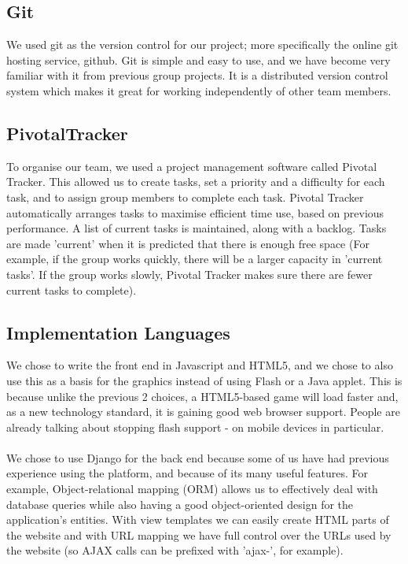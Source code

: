 \documentclass{article}
\begin{document}
\subsection{Git}
We used git as the version control for our project; more specifically the online git hosting service, github. Git is simple and easy to use, and we have become very familiar with it from previous group projects. It is a distributed version control system which makes it great for working independently of other team members.

\subsection{PivotalTracker}
To organise our team, we used a project management software called Pivotal Tracker. This allowed us to create tasks, set a priority and a difficulty for each task, and to assign group members to complete each task. Pivotal Tracker automatically arranges tasks to maximise efficient time use, based on previous performance. A list of current tasks is maintained, along with a backlog. Tasks are made 'current' when it is predicted that there is enough free space (For example, if the group works quickly, there will be a larger capacity in 'current tasks'. If the group works slowly, Pivotal Tracker makes sure there are fewer current tasks to complete).

\subsection{Implementation Languages}
We chose to write the front end in Javascript and HTML5, and we chose to also use this as a basis for the graphics instead of using Flash or a Java applet. This is because unlike the previous 2 choices, a HTML5-based game will load faster and, as a new technology standard, it is gaining good web browser support. People are already talking about stopping flash support - on mobile devices in particular. \\ \\
We chose to use Django for the back end because some of us have had previous experience using the platform, and because of its many useful features. For example, Object-relational mapping (ORM) allows us to effectively deal with database queries while also having a good object-oriented design for the application's entities. With view templates we can easily create HTML parts of the website and with URL mapping we have full control over the URLs used by the website (so AJAX calls can be prefixed with 'ajax-', for example).
\end{document}
